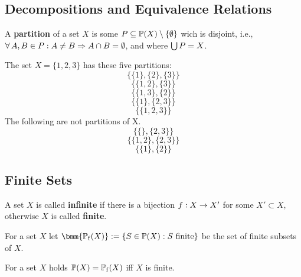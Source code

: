 \documentclass[12pt]{book}
\begin{document}
\subsection{Decompositions and Equivalence Relations}
\label{sec:Decompositions}

\begin{defi}\label{def:Decompositions}
  A \textbf{partition} of a set $X$ is some $P \subseteq \operatorname{\mathbb{P}}(X) \setminus \{ \emptyset \}$ wich is disjoint, i.e., $\forall\, A, B \in P : A \ne B \Rightarrow A \cap B = \emptyset$, and where $\bigcup P = X$.
\end{defi}
\begin{examp}\label{exp:Decompositions}
  The set $X = \{ 1, 2, 3 \} $ has these five partitions:
  $$ \{ \{1\}, \{2\}, \{3\}\}$$
  $$ \{ \{1,2\}, \{3\}\}$$
  $$ \{ \{1, 3\}, \{2\}\}$$
  $$ \{ \{1\}, \{2, 3\}\}$$
  $$ \{ \{ 1, 2, 3 \}\}$$
  The following are not partitions of X.
  $$ \{ \{\}, \{2, 3\}\}$$
  $$ \{ \{1, 2\}, \{2, 3\}\}$$
  $$ \{ \{1\}, \{2\}\}$$
\end{examp}

\subsection{Finite Sets}
\label{sec:Finite sets}

\begin{defi}\label{def:finite}
  A set $X$ is called \textbf{infinite} if there is a bijection $f: X \rightarrow X'$ for some $X' \subset X$, otherwise $X$ is called \textbf{finite}.
\end{defi}

\begin{defi}\label{def:finitesubs}
  For a set $X$ let $\bmm{\pote(X)} := \set{S \in \pot(X) : S \text{ finite}}$ be the set of finite subsets of $X$.
\end{defi}

\begin{lem}\label{lem:finitesubs}
  For a set $X$ holds $\operatorname{\mathbb{P}}(X) = \operatorname{\mathbb{P}_f}(X)$ iff $X$ is finite.
\end{lem}
\end{document}
